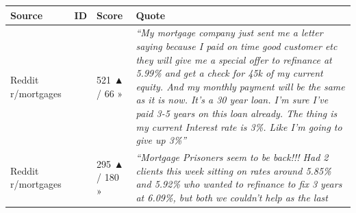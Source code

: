 \documentclass[
  10pt,
]{article}
\let\origtexttt\texttt
\renewcommand{\texttt}[1]{\origtexttt{\seqsplit{#1}}}
\begin{document}
\begin{longtable}[]{@{}llll@{}}
\toprule
\begin{minipage}[b]{0.20\columnwidth}\raggedright
Source\strut
\end{minipage} & \begin{minipage}[b]{0.14\columnwidth}\raggedright
ID\strut
\end{minipage} & \begin{minipage}[b]{0.10\columnwidth}\raggedright
Score\strut
\end{minipage} & \begin{minipage}[b]{0.44\columnwidth}\raggedright
Quote\strut
\end{minipage}\tabularnewline
\midrule
\endhead
\begin{minipage}[t]{0.20\columnwidth}\raggedright
Reddit r/mortgages\strut
\end{minipage} & \begin{minipage}[t]{0.14\columnwidth}\raggedright
\texttt{1qw5veu}\strut
\end{minipage} & \begin{minipage}[t]{0.10\columnwidth}\raggedright
521 ▲ / 66 »\strut
\end{minipage} & \begin{minipage}[t]{0.44\columnwidth}\raggedright
\emph{``My mortgage company just sent me a letter saying because I paid on time good customer etc
they will give me a special offer to refinance at 5.99\% and get a check for 45k of my current
equity. And my monthly payment will be the same as it is now. It's a 30 year loan. I'm sure I've
paid 3-5 years on this loan already. The thing is my current Interest rate is 3\%. Like I'm going to
give up 3\%''}\strut
\end{minipage}\tabularnewline
\begin{minipage}[t]{0.20\columnwidth}\raggedright
Reddit r/mortgages\strut
\end{minipage} & \begin{minipage}[t]{0.14\columnwidth}\raggedright
\texttt{1sks2br}\strut
\end{minipage} & \begin{minipage}[t]{0.10\columnwidth}\raggedright
295 ▲ / 180 »\strut
\end{minipage} & \begin{minipage}[t]{0.44\columnwidth}\raggedright
\emph{``Mortgage Prisoners seem to be back!!! Had 2 clients this week sitting on rates around 5.85\%
and 5.92\% who wanted to refinance to fix 3 years at 6.09\%, but both we couldn't help as the last
}
\end{minipage}
\end{longtable}
\end{document}
